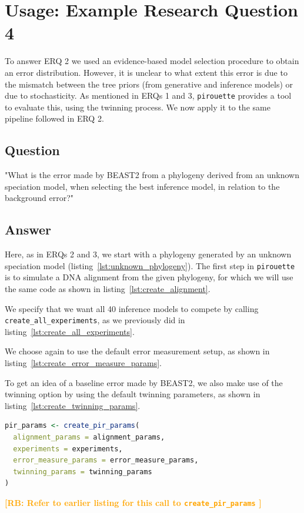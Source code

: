 \documentclass{article}
\newcommand{\richel}[1]{\textcolor{orange}{\textbf{[RB: #1]}}}
\begin{document}
\section{Usage: Example Research Question 4}

To answer ERQ 2 we used an evidence-based model selection procedure to obtain 
an 
error distribution.
However, it is unclear to what extent this error is due to the mismatch between 
the tree priors (from generative and inference models) or due to stochasticity. 
As mentioned in ERQs 1 and 3, \verb;pirouette; provides a tool to evaluate this, using 
the twinning process. We now apply it to the same pipeline followed in ERQ 2.

\subsection{Question}

"What is the error made by BEAST2 from a phylogeny 
derived from an unknown speciation model,
when selecting the best inference model, 
in relation to the background error?"

\subsection{Answer}

Here, as in ERQs 2 and 3, we start with a phylogeny 
generated by an unknown speciation model (listing~\ref{lst:unknown_phylogeny}). 
The first step in \verb;pirouette; is to simulate a DNA alignment 
from the given phylogeny, for which we will use the same code 
as shown in listing~\ref{lst:create_alignment}.

We specify that we want all 40 inference models to compete 
by calling \verb;create_all_experiments;,
as we previously did in listing~\ref{lst:create_all_experiments}.

We choose again to use the default error measurement setup,
as shown in listing~\ref{lst:create_error_measure_params}.

To get an idea of a baseline error made by BEAST2, 
we also make use of the twinning option by using the
default twinning parameters, as shown in 
listing~\ref{lst:create_twinning_params}.

\begin{lstlisting}[language=R, floatplacement=ht, frame=single]
pir_params <- create_pir_params(
  alignment_params = alignment_params,
  experiments = experiments,
  error_measure_params = error_measure_params,
  twinning_params = twinning_params
)
\end{lstlisting}
\richel{
  Refer to earlier listing for this call to \texttt{create\_pir\_params}
}
\end{document}
